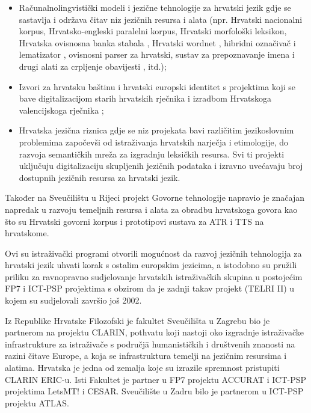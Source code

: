 \begin{multicols}{2}
\begin{itemize}
\item Računalnolingvistički modeli i jezične tehnologije za hrvatski jezik \cite{str30} gdje se sastavlja i održava čitav niz jezičnih resursa i alata (npr. Hrvatski nacionalni korpus, Hrvatsko-engleski paralelni korpus, Hrvatski morfološki leksikon, Hrvatska ovisnosna banka stabala \cite{str31}, Hrvatski wordnet \cite{str32}, hibridni označivač \cite{art8} i lematizator \cite{pro12}, ovisnosni parser za hrvatski, sustav za prepoznavanje imena i drugi alati za crpljenje obavijesti \cite{str33}, itd.);
\item Izvori za hrvatsku baštinu i hrvatski europski identitet \cite{str34} s projektima koji se bave digitalizacijom starih hrvatskih rječnika i izradbom Hrvatskoga valencijskoga rječnika \cite{art9};
\item Hrvatska jezična riznica \cite{str29} gdje se niz projekata bavi različitim jezikoslovnim problemima započevši od istraživanja hrvatskih narječja i etimologije, do razvoja semantičkih mreža za izgradnju leksičkih resursa. Svi ti projekti uključuju digitalizaciju skupljenih jezičnih podataka i izravno uvećavaju broj dostupnih jezičnih resursa za hrvatski jezik.
\end{itemize}

Također na Sveučilištu u Rijeci projekt Govorne tehnologije \cite{str38} napravio je značajan napredak u razvoju temeljnih resursa i alata za obradbu hrvatskoga govora kao što su Hrvatski govorni korpus i prototipovi sustava za ATR i TTS na hrvatskome.

Ovi su istraživački programi otvorili mogućnost da razvoj jezičnih tehnologija za hrvatski jezik uhvati korak s ostalim europskim jezicima, a istodobno su pružili priliku za ravnopravno sudjelovanje hrvatskih istraživačkih skupina u postojećim FP7 i ICT-PSP projektima s obzirom da je zadnji takav projekt (TELRI II) u kojem su sudjelovali završio još 2002.

Iz Republike Hrvatske Filozofski je fakultet Sveučilišta u Zagrebu bio je partnerom na projektu CLARIN, pothvatu koji nastoji oko izgradnje istraživačke infrastrukture za istraživače s područjā humanističkih i društvenih znanosti na razini čitave Europe, a koja se infrastruktura temelji na jezičnim resursima i alatima. Hrvatska je jedna od zemalja koje su izrazile spremnost pristupiti CLARIN ERIC-u. Isti Fakultet je partner u FP7 projektu ACCURAT i ICT-PSP projektima LetsMT! i CESAR. Sveučilište u Zadru bilo je partnerom u ICT-PSP projektu ATLAS.



\end{multicols}
